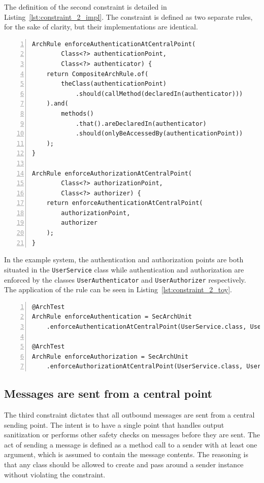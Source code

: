 The definition of the second constraint is detailed in Listing~\ref{lst:constraint_2_impl}. The constraint is defined as two separate rules, for the sake of clarity, but their implementations are identical.

\begin{minipage}{\linewidth}
\begin{lstlisting}[caption={Rule definition for constraint 2.}, captionpos=b, label=lst:constraint_2_impl, numbers=left]
ArchRule enforceAuthenticationAtCentralPoint(
        Class<?> authenticationPoint,
        Class<?> authenticator) {
    return CompositeArchRule.of(
        theClass(authenticationPoint)
            .should(callMethod(declaredIn(authenticator)))
    ).and(
        methods()
            .that().areDeclaredIn(authenticator)
            .should(onlyBeAccessedBy(authenticationPoint))
    );
}

ArchRule enforceAuthorizationAtCentralPoint(
        Class<?> authorizationPoint,
        Class<?> authorizer) {
    return enforceAuthenticationAtCentralPoint(
        authorizationPoint,
        authorizer
    );
}
\end{lstlisting}
\end{minipage}

In the example system, the authentication and authorization points are both situated in the \texttt{UserService} class while authentication and authorization are enforced by the classes \texttt{UserAuthenticator} and \texttt{UserAuthorizer} respectively. The application of the rule can be seen in Listing~\ref{lst:constraint_2_toy}.

\begin{minipage}{\linewidth}
\begin{lstlisting}[caption={Application of constraint 2 to the example system.}, captionpos=b, label=lst:constraint_2_toy, numbers=left]
@ArchTest
ArchRule enforceAuthentication = SecArchUnit
    .enforceAuthenticationAtCentralPoint(UserService.class, UserAuthenticator.class);

@ArchTest
ArchRule enforceAuthorization = SecArchUnit
    .enforceAuthorizationAtCentralPoint(UserService.class, UserAuthorizer.class);
\end{lstlisting}
\end{minipage}

\subsection{Messages are sent from a central point}
The third constraint dictates that all outbound messages are sent from a central sending point. The intent is to have a single point that handles output sanitization or performs other safety checks on messages before they are sent. The act of sending a message is defined as a method call to a sender with at least one argument, which is assumed to contain the message contents. The reasoning is that any class should be allowed to create and pass around a sender instance without violating the constraint.

